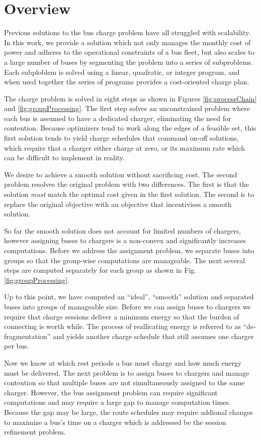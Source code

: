 \section{Overview}
Previous solutions to the bus charge problem have all struggled with scalability. In this work, we provide a solution which not only manages the monthly cost of power and adheres to the operational constraints of a bus fleet, but also scales to a large number of buses by segmenting the problem into a series of subproblems. Each subploblem is solved using a linear, quadratic, or integer program, and when used together the series of programs provides a cost-oriented charge plan. 
\par The charge problem is solved in eight steps as shown in Figures \ref{fig:processChain} and \ref{fig:groupProcessing}.  The first step solves an unconstrained problem where each bus is assumed to have a dedicated charger, eliminating the need for contention. Because optimizers tend to work along the edges of a feasible set, this first solution tends to yield charge schedules that command on-off solutions, which require that a charger either charge at zero, or its maximum rate which can be difficult to implement in reality. 
\par We desire to achieve a smooth solution without sacrificing cost. The second problem resolves the original problem with two differences. The first is that the solution {\it must} match the optimal cost given in the first solution. The second is to replace the original objective with an objective that incentivises a smooth solution.
\par So far the smooth solution does not account for limited numbers of chargers, however assigning buses to chargers is a non-convex and significantly increases computations. Before we address the assignment problem, we separate buses into groups so that the group-wise computations are manageable. The next several steps are computed separately for each group as shown in Fig. \ref{fig:groupProcessing}.  
\par Up to this point, we have computed an ``ideal'', ``smooth'' solution and separated buses into groups of manageable size. Before we can assign buses to chargers we require that charge sessions deliver a minimum energy so that the burden of connecting is worth while. The process of reallicating energy is referred to as ``de-fragmentation'' and yields another charge schedule that still assumes one charger per bus.
\par Now we know at which rest periods a bus must charge and how much energy must be delivered.  The next problem is to assign buses to chargers and manage contention so that multiple buses are not simultaneously assigned to the same charger. However, the bus assignment problem can require significant computations and may require a large gap to manage computation times. Because the gap may be large, the route schedules may require addional changes to maximize a bus's time on a charger which is addressed be the session refinement problem. 
